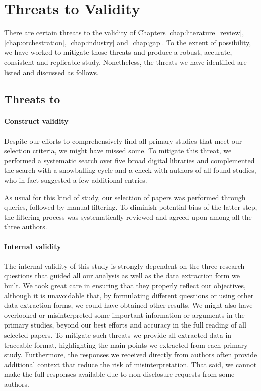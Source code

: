 \section{Threats to Validity}\label{sec:threats}

There are certain threats to the validity of Chapters \ref{chap:literature_review}, \ref{chap:orchestration}, \ref{chap:industry} and \ref{chap:gap}.
To the extent of possibility, we have worked to mitigate those threats and produce a robust, accurate, consistent and replicable study.
Nonetheless, the threats we have identified are listed and discussed as follows.

\subsection{Threats to  }

\paragraph{Construct validity} Despite our efforts to comprehensively find all primary studies that meet our selection criteria, we might have missed some.
To mitigate this threat, we performed a systematic search over five broad digital libraries and complemented the search with a snowballing cycle and a check with authors of all found studies, who in fact suggested a few additional entries.

As usual for this kind of study, our selection of papers was performed through queries, followed by manual filtering.
To diminish potential bias of the latter step, the filtering process was systematically reviewed and agreed upon among all the three authors.

\paragraph{Internal validity} The internal validity of this study is strongly dependent on the three research questions that guided all our analysis as well as the data extraction form we  built.
We took great care in ensuring that they properly reflect our objectives, although it is unavoidable that, by formulating  different questions or using other data extraction forms, we could have obtained other results.
We might also have overlooked or misinterpreted some important information or arguments in the primary studies, beyond our best efforts and accuracy in the full reading of all selected papers.
To mitigate such threats we provide all extracted data in traceable format, highlighting the main points we extracted from each primary study.
Furthermore, the responses we received directly from authors often provide additional context that reduce the risk of misinterpretation.
That said, we cannot make the full responses available due to non-disclosure requests from some authors.


